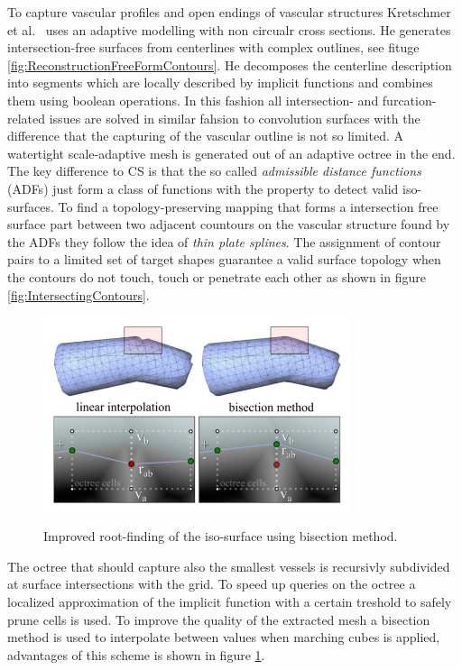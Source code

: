 To capture vascular profiles and open endings of vascular structures Kretschmer et al.~\cite{kretschmer2012reliable} uses an adaptive modelling with non circualr cross sections. He generates intersection-free surfaces from centerlines with complex outlines, see fituge \ref{fig:ReconstructionFreeFormContours}. He decomposes the centerline description into segments which are locally described by implicit functions and combines them using boolean operations. In this fashion all intersection- and furcation-related issues are solved in similar fahsion to convolution surfaces with the difference that the capturing of the vascular outline is not so limited. A watertight scale-adaptive mesh is generated out of an adaptive octree in the end. The key difference to CS is that the so called \emph{admissible distance functions} (ADFs) just form a class of functions with the property to detect valid iso-surfaces. To find a topology-preserving mapping that forms a intersection free surface part between two adjacent countours on the vascular structure found by the ADFs they follow the idea of \emph{thin plate splines}. The assignment of contour pairs to a limited set of target shapes guarantee a valid surface topology when the contours do not touch, touch or penetrate each other as shown in figure \ref{fig:IntersectingContours}.

\begin{figure}[h]
	\centering
	\includegraphics[width=0.8\textwidth]{./Images/BisectionMethod.png} \\
	\caption{Improved root-finding of the iso-surface using bisection method.}
	\cite{kretschmer2012reliable}
	\label{fig:BisectionMethod}
\end{figure} 

The octree that should capture also the smallest vessels is recursivly subdivided at surface intersections with the grid. To speed up queries on the octree a localized approximation of the implicit function with a certain treshold to safely prune cells is used.
To improve the quality of the extracted mesh a bisection method is used to interpolate between values when marching cubes is applied, advantages of this scheme is shown in figure \ref{fig:BisectionMethod}.

 
